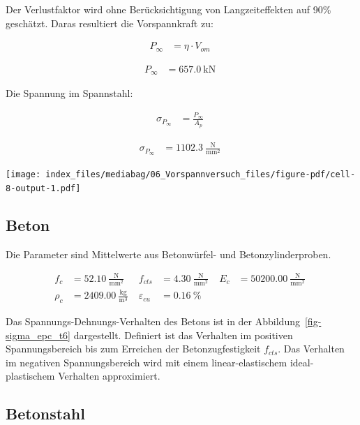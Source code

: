 \documentclass[
  11pt,
  letterpaper,
]{scrreprt}
\begin{document}
Der Verlustfaktor wird ohne Berücksichtigung von Langzeiteffekten auf
90\% geschätzt. Daras resultiert die Vorspannkraft zu:

$$
\begin{aligned}
P_{\infty} &= \eta \cdot V_{om} \; 
\end{aligned}
$$

$$
\begin{aligned}
P_{\infty} &= 657.0\ \mathrm{kN} \;
\end{aligned}
$$

Die Spannung im Spannstahl:

$$
\begin{aligned}
\sigma_{P_{\infty}} &= \frac{ P_{\infty} }{ A_{p} } \; 
\end{aligned}
$$

$$
\begin{aligned}
\sigma_{P_{\infty}} &= 1102.3\ \frac{\mathrm{N}}{\mathrm{mm}^{2}} \;
\end{aligned}
$$

\texttt{[image: index\_files/mediabag/06\_Vorspannversuch\_files/figure-pdf/cell-8-output-1.pdf]}

\subsection{Beton}\label{beton}

Die Parameter sind Mittelwerte aus Betonwürfel- und Betonzylinderproben.

$$
\begin{aligned}
f_{c} &= 52.10\ \frac{\mathrm{N}}{\mathrm{mm}^{2}} \; 
 &f_{cts} &= 4.30\ \frac{\mathrm{N}}{\mathrm{mm}^{2}} \; 
 &E_{c} &= 50200.00\ \frac{\mathrm{N}}{\mathrm{mm}^{2}} \; 
\\[10pt]
 \rho_{c} &= 2409.00\ \frac{\mathrm{kg}}{\mathrm{m}^{3}} \; 
 &\varepsilon_{cu} &= 0.16\ \mathrm{\%} \;
\end{aligned}
$$

Das Spannungs-Dehnungs-Verhalten des Betons ist in der
Abbildung~\ref{fig-sigma_epc_t6} dargestellt. Definiert ist das
Verhalten im positiven Spannungsbereich bis zum Erreichen der
Betonzugfestigkeit \(f_{cts}\). Das Verhalten im negativen
Spannungsbereich wird mit einem linear-elastischem ideal-plastischem
Verhalten approximiert.

\subsection{Betonstahl}\label{betonstahl}
\end{document}
